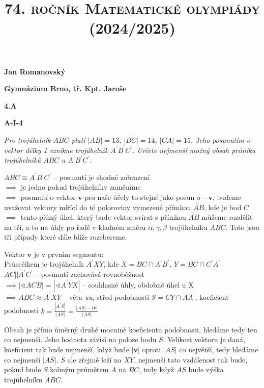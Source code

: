 \documentclass{article}
\title{\normalsize{\vspace{-2cm}\textsc{74. ročník Matematické olympiády (2024/2025)}\vspace{-1.7cm}}}
\date{}
\author{}
\begin{document}
\maketitle

\textbf{ }

\noindent \textbf{Jan Romanovský}

\noindent \textbf{Gymnázium Brno, tř. Kpt. Jaroše}

\noindent \textbf{4.A}

\noindent \textbf{A-\textrm{I}-4}

\textbf{ }

\textit{Pro trojúhelník $ABC$ platí $|AB| = 13$, $|BC| = 14$, $|CA| = 15$. Jeho posunutím o vektor délky 1 vznikne trojúhelník $A^\prime B^\prime C^\prime$. Určete nejmenší možný obsah průniku trojúhelníků $ABC$ a $A^\prime B^\prime C^\prime$.}

\textbf{ }

$ABC \cong A^\prime B^\prime C^\prime$ -- posunutí je shodné zobrazení\\
$\implies$ je jedno pokud trojúhelníky zaměníme\\
$\implies$ posunutí o vektor $\mathbf{v}$ pro naše účely to stejné jako posun o $\mathbf{-v}$, budeme uvažovat vektory mířící do té poloroviny vymezené přímkou $\overleftrightarrow{AB}$, kde je bod $C$\\
$\implies$ tento přímý úhel, který bude vektor svírat s přímkou $\overleftrightarrow{AB}$ můžeme rozdělit na tři, a to na úhly po řadě v kladném směru $\alpha, \gamma, \beta$ trojúhelníku $ABC$. Toto jsou tři případy které dále blíže rozebereme.

\textbf{ }

Vektor $\mathbf{v}$ je v prvním segmentu:\\
Průsečíkem je trojúhelník $A^\prime XY$, kde $X = BC \cap A^\prime B^\prime$, $Y = BC \cap C^\prime A^\prime$\\
$AC || A^\prime C^\prime$ -- posunutí zachovává rovnoběžnost\\
$\implies | \sphericalangle ACB| = | \sphericalangle A^\prime YX|$ -- souhlasné úhly, obdobně úhel u X\\
$\implies ABC \approx A^\prime XY$ -- věta \textit{uu}, střed podobnosti $S = CY \cap AA^\prime$, koeficient podobnosti $k = \frac{|A^\prime S|}{|AS|} = \frac{|AS|-|\textbf{v}|}{|AS|}$

\textbf{ }

Obsah je přímo úměrný druhé mocnině koeficientu podobnosti, hledáme tedy ten co nejmenší. Jeho hodnota závisí na poloze bodu $S$. Velikost vektoru je daná, koeficient tak bude nejmenší, když bude $|\textbf{v}|$ oproti $|AS|$ co největší, tedy hledáme co nejmenší $|AS|$. $S$ ale zřejmě leží na $XY$, nejmenší tato vzdálenost tak bude, pokud bude $S$ kolmým průmětem $A$ na $BC$, tedy když $AS$ bude výška trojúhelníku $ABC$.
\end{document}
